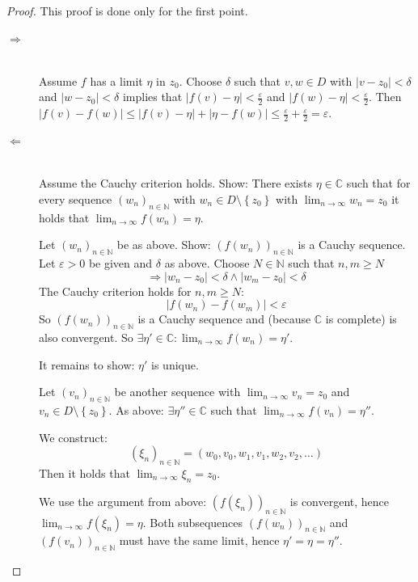 \documentclass[a4paper,landscape,twocolumn]{article}
\theoremstyle{definition}
\newcommand\set[1]{\left\{#1\right\}}
\newcommand\abs[1]{\left|#1\right|}
\begin{document}
\begin{proof}
  This proof is done only for the first point.

  \begin{description}
    \item[$\Rightarrow$] \hfill{} \\
      Assume $f$ has a limit $\eta$ in $z_0$. Choose $\delta$ such that $v,w \in D$
      with $\abs{v - z_0} < \delta$ and $\abs{w - z_0} < \delta$ implies
      that $\abs{f(v) - \eta} < \frac\varepsilon2$ and $\abs{f(w) - \eta} < \frac\varepsilon2$.
      Then $\abs{f(v) - f(w)} \leq \abs{f(v) - \eta} + \abs{\eta - f(w)}
      \leq \frac\varepsilon2 + \frac\varepsilon2 = \varepsilon$.
    \item[$\Leftarrow$] \hfill{} \\
      Assume the Cauchy criterion holds. Show: There exists $\eta \in \mathbb C$
      such that for every sequence $(w_n)_{n \in \mathbb N}$
      with $w_n \in D \setminus \set{z_0}$ with $\lim_{n\to\infty} w_n = z_0$
      it holds that $\lim_{n\to\infty} f(w_n) = \eta$.

      Let $(w_n)_{n\in\mathbb N}$ be as above. Show: $(f(w_n))_{n\in\mathbb N}$
      is a Cauchy sequence. Let $\varepsilon > 0$ be given and $\delta$ as above.
      Choose $N \in \mathbb N$ such that $n,m \geq N$
      \[ \Rightarrow \abs{w_n - z_0} < \delta \land \abs{w_m - z_0} < \delta \]
      The Cauchy criterion holds for $n,m \geq N$:
      \[ \abs{f(w_n) - f(w_m)} < \varepsilon \]
      So $(f(w_n))_{n \in \mathbb N}$ is a Cauchy sequence and (because $\mathbb C$ is complete)
      is also convergent.
      So $\exists \eta' \in \mathbb C: \lim_{n\to\infty} f(w_n) = \eta'$.

      It remains to show: $\eta'$ is unique.

      Let $(v_n)_{n\in\mathbb N}$ be another sequence with $\lim_{n\to\infty} v_n = z_0$
      and $v_n \in D \setminus \set{z_0}$. As above: $\exists \eta'' \in \mathbb C$ such that
      $\lim_{n\to\infty} f(v_n) = \eta''$.

      We construct:
      \[ (\xi_n)_{n\in\mathbb N} = (w_0, v_0, w_1, v_1, w_2, v_2, \ldots) \]
      Then it holds that $\lim_{n\to\infty} \xi_n = z_0$.

      We use the argument from above: $(f(\xi_n))_{n\in\mathbb N}$ is convergent,
      hence $\lim_{n\to\infty} f(\xi_n) = \eta$.
      Both subsequences $(f(w_n))_{n\in\mathbb N}$ and $(f(v_n))_{n\in\mathbb N}$
      must have the same limit, hence $\eta' = \eta = \eta''$.
  \end{description}
\end{proof}
\end{document}
